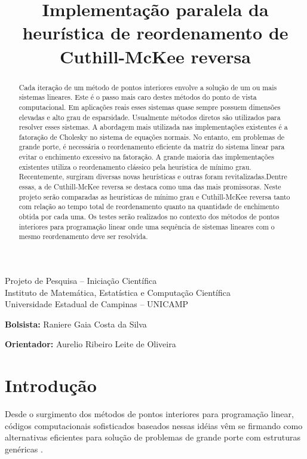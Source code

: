 \documentclass[12pt]{article}
\begin{document}
\title{Implementação paralela da heurística de reordenamento
de Cuthill-McKee reversa}
\maketitle

{\bf
\begin{center}
Projeto de Pesquisa -- Iniciação Científica\\
Instituto de Matemática, Estatística e Computação Científica\\
Universidade Estadual de Campinas -- UNICAMP
\end{center}
}

{\bf Bolsista:} Raniere Gaia Costa da Silva

{\bf Orientador:} Aurelio Ribeiro Leite de Oliveira

\begin{abstract}
Cada iteração de um método de pontos interiores envolve a solução
de um ou mais sistemas lineares. Este é o passo mais
caro destes métodos do ponto de vista computacional.
Em aplicações reais esses sistemas quase
sempre possuem dimensões elevadas e alto grau de esparsidade.
Usualmente métodos diretos são utilizados para resolver esses sistemas.
A abordagem mais utilizada nas implementações existentes é a fatoração
de Cholesky no sistema de equações normais.
No entanto, em problemas de grande porte, é necessária o reordenamento
eficiente da matriz do sistema linear para evitar o enchimento excessivo
na fatoração. A grande maioria das implementações existentes utiliza
o reordenamento clássico pela heurística de mínimo grau.
Recentemente, surgiram diversas novas heurísticas e outras foram revitalizadas.Dentre essas, a de Cuthill-McKee reversa
se destaca como uma das mais promissoras.
Neste projeto serão comparadas as heurísticas de mínimo grau e Cuthill-McKee
reversa tanto com relação ao tempo total de reordenamento quanto
na quantidade de enchimento obtida por cada uma. Os testes serão realizados
no contexto dos métodos de pontos interiores para programação linear
onde uma sequência de sistemas lineares com o mesmo reordenamento
deve ser resolvida.
\end{abstract}

\section{Introdução}

Desde o surgimento dos métodos de pontos interiores para programação linear,
códigos computacionais sofisticados baseados nessas idéias vêm se firmando como
alternativas eficientes para solução de problemas de grande porte com
estruturas genéricas \cite{ARVK89,BCO06,CMWW96,Go96,LMS92,OS03,OL91}.
\end{document}

